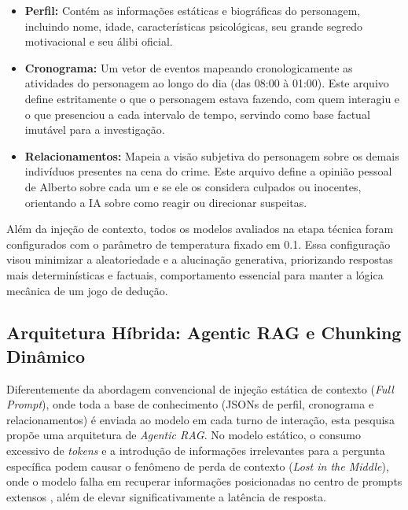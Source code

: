 \documentclass[12pt]{article}
\begin{document}
\begin{itemize}
    \item \textbf{Perfil:} Contém as informações estáticas e biográficas do personagem, incluindo nome, idade, características psicológicas, seu grande segredo motivacional e seu álibi oficial.
    \item \textbf{Cronograma:} Um vetor de eventos mapeando cronologicamente as atividades do personagem ao longo do dia (das 08:00 à 01:00). Este arquivo define estritamente o que o personagem estava fazendo, com quem interagiu e o que presenciou a cada intervalo de tempo, servindo como base factual imutável para a investigação.
    \item \textbf{Relacionamentos:} Mapeia a visão subjetiva do personagem sobre os demais indivíduos presentes na cena do crime. Este arquivo define a opinião pessoal de Alberto sobre cada um e se ele os considera culpados ou inocentes, orientando a IA sobre como reagir ou direcionar suspeitas.
\end{itemize}

Além da injeção de contexto, todos os modelos avaliados na etapa técnica foram configurados com o parâmetro de temperatura fixado em 0.1. Essa configuração visou minimizar a aleatoriedade e a alucinação generativa, priorizando respostas mais determinísticas e factuais, comportamento essencial para manter a lógica mecânica de um jogo de dedução.

\subsection{Arquitetura Híbrida: Agentic RAG e Chunking Dinâmico}

Diferentemente da abordagem convencional de injeção estática de contexto (\textit{Full Prompt}), onde toda a base de conhecimento (JSONs de perfil, cronograma e relacionamentos) é enviada ao modelo em cada turno de interação, esta pesquisa propõe uma arquitetura de \textit{Agentic RAG}. No modelo estático, o consumo excessivo de \textit{tokens} e a introdução de informações irrelevantes para a pergunta específica podem causar o fenômeno de perda de contexto (\textit{Lost in the Middle}), onde o modelo falha em recuperar informações posicionadas no centro de prompts extensos \cite{liu2023lost}, além de elevar significativamente a latência de resposta.
\end{document}
